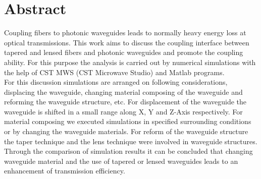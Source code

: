 \chapter*{Abstract}
\label{cha:kurzfassung}
Coupling fibers to photonic waveguides leads to normally heavy energy loss at optical transmissions. This work aims to discuss the coupling interface between tapered and lensed fibers and photonic waveguides and promote the coupling ability. For this purpose the analysis is carried out by numerical simulations with the help of CST MWS (CST Microwave Studio\textregistered) and Matlab programs. \\

For this discussion simulations are arranged on following considerations, displacing the waveguide, changing material composing of the waveguide and reforming the waveguide structure, etc. For displacement of the waveguide the waveguide is shifted in a small range along X, Y and Z-Axis respectively. For material composing we executed simulations in specified surrounding conditions or by changing the waveguide materials. For reform of the waveguide structure the taper technique and the lens technique were involved in waveguide structures. \\

Through the comparison of simulation results it can be concluded that changing waveguide material and the use of tapered or lensed waveguides leads to an enhancement of transmission efficiency.
